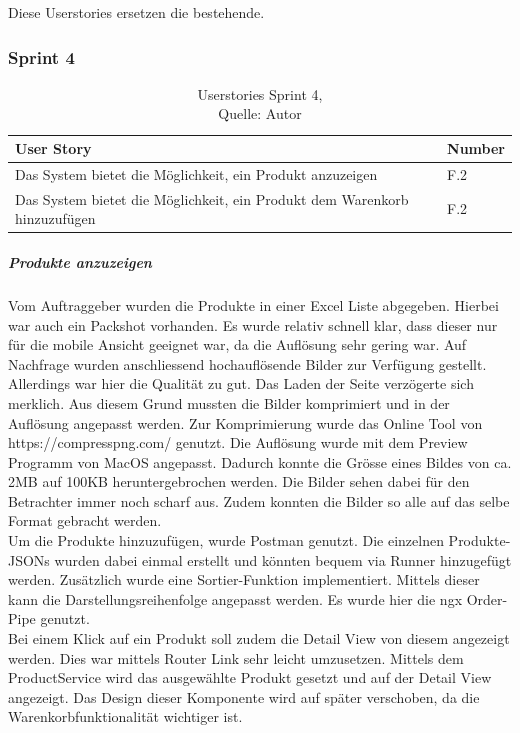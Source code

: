 Diese Userstories ersetzen die bestehende.


\subsubsection{Sprint 4}
\begin{table}[H]
	\begin{tabularx}{\textwidth}{|l|X|}
		\hline
		\textbf{User Story} & \textbf{Number} \\
		\hline
		Das System bietet die Möglichkeit, ein Produkt anzuzeigen& F.2\\
		\hline
		Das System bietet die Möglichkeit, ein Produkt dem Warenkorb hinzuzufügen& F.2\\
		\hline
	\end{tabularx} 
	\caption[Userstories Sprint 4]{Userstories Sprint 4,\\ Quelle: Autor}
\end{table}\label{userStoriesSprint4}

\subparagraph{Produkte anzuzeigen}
Vom Auftraggeber wurden die Produkte in einer Excel Liste abgegeben. Hierbei war auch ein Packshot vorhanden. Es wurde relativ schnell klar, dass dieser nur für die mobile Ansicht geeignet war, da die Auflösung sehr gering war. Auf Nachfrage wurden anschliessend hochauflösende Bilder zur Verfügung gestellt. Allerdings war hier die Qualität zu gut. Das Laden der Seite verzögerte sich merklich. Aus diesem Grund mussten die Bilder komprimiert und in der Auflösung angepasst werden. Zur Komprimierung wurde das Online Tool von https://compresspng.com/ genutzt. Die Auflösung wurde mit dem Preview Programm von MacOS angepasst. Dadurch konnte die Grösse eines Bildes von ca. 2MB auf 100KB heruntergebrochen werden. Die Bilder sehen dabei für den Betrachter immer noch scharf aus. Zudem konnten die Bilder so alle auf das selbe Format gebracht werden. \\
Um die Produkte hinzuzufügen, wurde Postman genutzt. Die einzelnen Produkte-JSONs wurden dabei einmal erstellt und könnten bequem via Runner hinzugefügt werden. 
Zusätzlich wurde eine Sortier-Funktion implementiert. Mittels dieser kann die Darstellungsreihenfolge angepasst werden. Es wurde hier die ngx Order-Pipe genutzt. \\
Bei einem Klick auf ein Produkt soll zudem die Detail View von diesem angezeigt werden. Dies war mittels Router Link sehr leicht umzusetzen. Mittels dem ProductService wird das ausgewählte Produkt gesetzt und auf der Detail View angezeigt. Das Design dieser Komponente wird auf später verschoben, da die Warenkorbfunktionalität wichtiger ist. 

